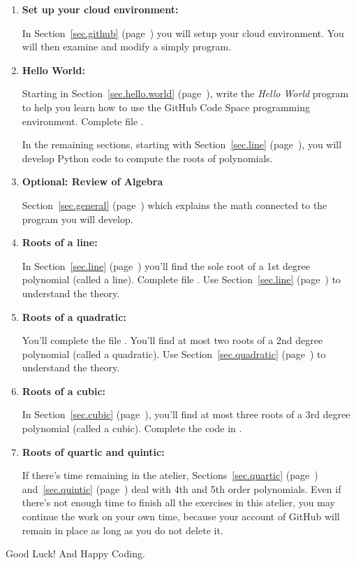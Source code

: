 \begin{enumerate}  

\item \textbf{Set up your cloud environment:}

  In Section~\ref{sec.github} (page~\pageref{sec.github}) you will setup your cloud environment. You
  will then examine and modify a simply  program.

\item \textbf{Hello World:}

  Starting in Section~\ref{sec.hello.world} (page~\pageref{sec.hello.world}), write the
  \emph{Hello World} program to help you learn how to use the GitHub
  Code Space programming environment.  Complete file .

In the remaining sections, starting with Section~\ref{sec.line} (page~\pageref{sec.line}), you
will develop Python code to compute the roots of polynomials.  


\item \textbf{Optional: Review of Algebra}

  Section~\ref{sec.general} (page~\pageref{sec.general}) which explains the math
  connected to the program you will develop.


\item \textbf{Roots of a line:}

  In Section~\ref{sec.line} (page~\pageref{sec.line}) you'll find the sole root of a 1st
  degree polynomial (called a line).  Complete file .
  Use Section~\ref{sec.line} (page~\pageref{sec.line}) to understand the theory.

\item \textbf{Roots of a quadratic:}

  You'll complete the file
  .  You'll find at most two roots of a 2nd degree
  polynomial (called a quadratic).  Use Section~\ref{sec.quadratic} (page~\pageref{sec.quadratic}) to
  understand the theory.

\item \textbf{Roots of a cubic:}

  In Section~\ref{sec.cubic} (page~\pageref{sec.cubic}), you'll find at most
  three roots of a 3rd degree polynomial (called a cubic).  Complete
  the code in .

\item \textbf{Roots of quartic and quintic:}

  If there's time remaining in the
  atelier, Sections~\ref{sec.quartic} (page~\pageref{sec.quartic}) and~\ref{sec.quintic} (page~\pageref{sec.quintic}) deal with
  4th and 5th order polynomials.  Even if there's not enough time to
  finish all the exercises in this atelier, you may continue the work
  on your own time, because your account of GitHub will remain in
  place as long as you do not delete it.
  
\end{enumerate}


Good Luck! And Happy Coding.


